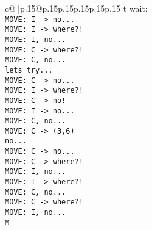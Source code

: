 \documentclass{article}
\begin{document}
{\begin{supertabular}{c@{$\;$}|p{.15\linewidth}@{}p{.15\linewidth}p{.15\linewidth}p{.15\linewidth}p{.15\linewidth}p{.15\linewidth}}
{{{t  wait: \\ \tt  MOVE: I -> no...\\ \tt  MOVE: I -> where?!\\ \tt  MOVE: I, no...\\ \tt  MOVE: C -> where?!\\ \tt  MOVE: C, no...\\ \tt  lets try...\\ \tt  MOVE: C -> no...\\ \tt  MOVE: I -> where?!\\ \tt  MOVE: C -> no!\\ \tt  MOVE: I -> no...\\ \tt  MOVE: C, no...\\ \tt  MOVE: C -> (3,6) \\ \tt  no...\\ \tt  MOVE: C -> no...\\ \tt  MOVE: C -> where?!\\ \tt  MOVE: I, no...\\ \tt  MOVE: I -> where?!\\ \tt  MOVE: C, no...\\ \tt  MOVE: C -> where?!\\ \tt  MOVE: I, no...\\ \tt  M}}}
\end{supertabular}}
\end{document}
